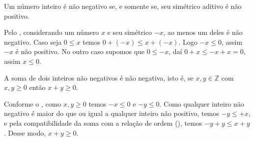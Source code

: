 \documentclass[../main.tex]{subfiles}
\begin{document}
\begin{corol}\label{int-corol-simetricoSinalTrocado}
    Um número inteiro é não negativo se, e somente se, seu simétrico aditivo é não positivo.
\end{corol}
\begin{dem}
    Pelo , considerando um número $x$ e seu simétrico $-x$, ao menos um deles é não negativo. Caso seja $0 \leq x$ temos $0 + (-x) \leq x + (-x)$. Logo $-x \leq 0$, assim $-x$ é não positivo. No outro caso supomos que $0 \leq -x$, daí 
    $0 + x \leq -x + x = 0$, assim $x \leq 0$.
\end{dem}

\begin{prop}\label{int-prop-somaPositivosPositiva}
    A soma de dois inteiros não negativos é não negativa, isto é, se $x, y \in \mathbb{Z}$ com $x,y \geq 0$ então $x+y \geq 0$.
\end{prop}
\begin{dem}
    Conforme o , como $x,y \geq 0$ temos $-x \leq 0$ e $-y \leq 0$. Como qualquer inteiro não negativo é maior do que ou igual a qualquer inteiro não positivo, temos $-y \leq +x$, e pela compatibilidade da soma com a relação de ordem (), temos 
    $-y + y \leq x + y$. Desse modo, $x+y \geq 0$.
\end{dem}


\end{document}

